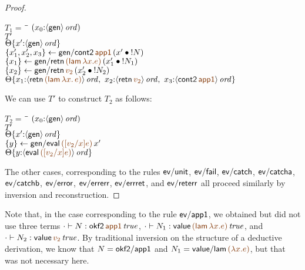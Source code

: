 \begin{proof}
\begin{description}
\begin{tabbing}
$T_1 = ~$ \= \qquad \= $(x_0{:}{\langle {\sf gen} \rangle}\,{{\it ord}})$
\\
\>$T'$
\\
\>\>${\Theta}\{{x'{:}{\langle {\sf gen} \rangle}\,{{\it ord}}}\}$
\\
\>$\trstep{x_1', x_2', x_3}
     {{\sf gen/cont2}\,\lf{\sf app1}\,(\tfuser{x'}{\tbangr{N}})}$
\\
\>$\trstep{x_1}
     {{\sf gen/retn}\,\lf{({\sf lam}\,\lambda x.e)}\,
        (\tfuser{x_1'}{\tbangr{N_1}})}$ 
\\
\>$\trstep{x_2}
     {{\sf gen/retn}\,\lf{v_2}\,(\tfuser{x_2'}{\tbangr{N_2}})}$
\\
\>\>$\tackon{\Theta}{x_1{:}\istrue{\susp{{\sf retn}\,\lf{({\sf lam}\,\lambda x.\,e)}}}, ~
                   x_2{:}\istrue{\susp{{\sf retn}\,\lf{v_2}}}, ~
                   x_3{:}\istrue{\susp{{\sf cont2}\,\lf{\sf app1}}}}$
\end{tabbing}

We can use $T'$ to construct $T_2$ as follows:
\begin{tabbing}
$T_2 = ~$ \= \qquad \= $(x_0{:}{\langle {\sf gen} \rangle}\,{{\it ord}})$
\\
\>$T'$
\\
\>\>${\Theta}\{{x'{:}{\langle {\sf gen} \rangle}\,{{\it ord}}}\}$
\\
\>$\trstep{y}
     {{\sf gen/eval}\,\lf{([v_2/x]e)}\,x'}$
\\
\>\>$\tackon{\Theta}{y{:}\istrue{\susp{{\sf eval}\,\lf{([v_2/x]e)}}}}$
\end{tabbing}


\end{description}

\noindent
The other cases, corresponding to the rules ${\sf ev/unit}$, ${\sf
  ev/fail}$, ${\sf ev/catch}$, ${\sf ev/catcha}$, ${\sf ev/catchb}$,
${\sf ev/error}$, ${\sf ev/errerr}$, ${\sf ev/errret}$, and ${\sf
  ev/reterr}$ all proceed similarly by inversion and
reconstruction. 
\end{proof}

Note that, in the case corresponding to the rule ${\sf ev/app1}$, we
obtained but did not use three terms $\cdot \vdash N : \isconc{{{\sf
    okf2}\,\lf{\sf app1}}}$, $\cdot \vdash N_1 : \isconc{{\sf value}\,\lf{({\sf
    lam}\,\lambda x.e)}}$, and $\cdot \vdash N_2 : \isconc{{{\sf
    value}\,\lf{v_2}}}$. By traditional inversion on the structure of a
deductive derivation, we know that $N = {\sf okf2/app1}$ and $N_1 =
{\sf value/lam}\,\lf{(\lambda x.e)}$, but that was not necessary here.


